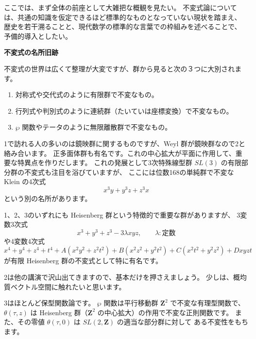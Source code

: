 \documentclass[uplatex,dvipdfmx]{jlreq}
\begin{document}
\medskip

ここでは、まず全体の前座として大雑把な概観を見たい。
不変式論については、共通の知識を仮定できるほど標準的なものとなっていない現状を踏まえ、
歴史を若干溯ることと、現代数学の標準的な言葉での枠組みを述べることで、
予備的導入としたい。

\newpage

\begin{center}
  {\Large\bfseries 不変式の名所旧跡}
\end{center}

\bigskip
\hspace*{\fill}{\large\bfseries 向井　茂}

\bigskip

不変式の世界は広くて整理が大変ですが、群から見ると次の３つに大別されます。
\begin{enumerate}
  \item 対称式や交代式のように有限群で不変なもの。
  \item 行列式や判別式のように連続群（たいていは座標変換）で不変なもの。
  \item $\wp$ 関数やテータのように無限離散群で不変なもの。
\end{enumerate}

1で訪れる人の多いのは鏡映群に関するものですが、Weyl 群が鏡映群なので2と絡み合います。
正多面体群も有名です。これの中心拡大が平面に作用して、重要な特異点を作りだします。
これの発展として3次特殊線型群 $SL(3)$ の有限部分群の不変式も注目を浴びていますが、
ここには位数168の単純群で不変な Klein の4次式
\[
  x^3 y + y^3 z + z^3 x
\]
という別の名所があります。

1、2、3のいずれにも Heisenberg 群という特徴的で重要な群がありますが、
3変数3次式
\[
  x^3 + y^3 + z^3 - 3\lambda xyz, \qquad \lambda : \text{定数}
\]
や4変数4次式
\[
  x^4 + y^4 + z^4 + t^4 + A(x^2 y^2 + z^2 t^2)
  + B(x^2 z^2 + y^2 t^2) + C(x^2 t^2 + y^2 z^2) + Dxyzt
\]
が有限 Heisenberg 群の不変式として特に有名です。

2は他の講演で沢山出てきますので、基本だけを押さえましょう。
少しは、概均質ベクトル空間に触れたいと思います。

3はほとんど保型関数論です。
$\wp$ 関数は平行移動群 $\mathbf{Z}^2$ で不変な有理型関数で、
$\theta(\tau, z)$ は Heisenberg 群（$\mathbf{Z}^2$ の中心拡大）の作用で不変な正則関数です。
また、その零値 $\theta(\tau, 0)$ は $SL(2, \mathbf{Z})$ の適当な部分群に対して
ある不変性をもちます。
\end{document}
